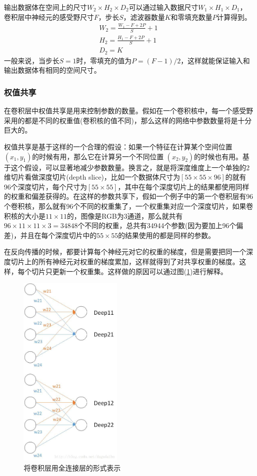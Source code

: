 \documentclass[UTF-8, a4paper, 12pt]{ctexart}
\begin{document}
输出数据体在空间上的尺寸$W_2\times H_2\times D_2$可以通过输入数据尺寸$W_1\times H_1\times D_1$，卷积层中神经元的感受野尺寸$F$，步长$S$，滤波器数量$K$和零填充数量$P$计算得到。
\begin{gather}
    W_2=\frac{W_1-F+2P}{S}+1
    \\
   H_2=\frac{H_1-F+2P}{S}+1\\
D_2=K
\end{gather}
一般来说，当步长$S=1$时，零填充的值为$P=(F-1)/2$，这样就能保证输入和输出数据体有相同的空间尺寸。

\subsubsection{权值共享}

在卷积层中权值共享是用来控制参数的数量。假如在一个卷积核中，每一个感受野采用的都是不同的权重值(卷积核的值不同)，那么这样的网络中参数数量将是十分巨大的。

权值共享是基于这样的一个合理的假设：如果一个特征在计算某个空间位置 $(x_1,y_1)$的时候有用，那么它在计算另一个不同位置 $(x_2,y_2) $的时候也有用。基于这个假设，可以显著地减少参数数量。换言之，就是将深度维度上一个单独的2维切片看做深度切片(depth slice)，比如一个数据体尺寸为$[55\times 55\times 96]$的就有96个深度切片，每个尺寸为$[55\times 55]$，其中在每个深度切片上的结果都使用同样的权重和偏差获得的。在这样的参数共享下，假如一个例子中的第一个卷积层有96个卷积核，那么就有96个不同的权重集了，一个权重集对应一个深度切片，如果卷积核的大小是$ 11\times 11$的，图像是RGB为3通道，那么就共有$96\times 11\times 11\times 3=34848$个不同的权重，总共有34944个参数(因为要加上96个偏差)，并且在每个深度切片中的$55\times 55 $的结果使用的都是同样的参数。

在反向传播的时候，都要计算每个神经元对它的权重的梯度，但是需要把同一个深度切片上的所有神经元对权重的梯度累加，这样就得到了对共享权重的梯度。这样，每个切片只更新一个权重集。这样做的原因可以通过图(\ref{f3})进行解释。

\begin{figure}[htbp]
    \centering
    \includegraphics[width=5cm]{fig/f3.jpg}
    \caption{将卷积层用全连接层的形式表示}
    \label{f3}
\end{figure}
\end{document}
